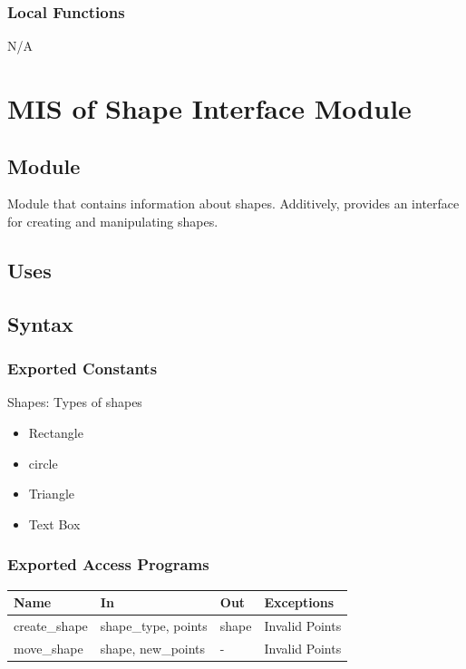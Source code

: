 \documentclass[12pt, titlepage]{article}
\begin{document}
\subsubsection{Local Functions}
N/A

\newpage\section{MIS of {Shape Interface Module}} \label{Shape Interface Module}
%
%

\subsection{Module}
Module that contains information about shapes. Additively, provides an interface for creating and manipulating shapes.

\subsection{Uses}


\subsection{Syntax}

\subsubsection{Exported Constants}
Shapes: Types of shapes
\begin{itemize}
\item{Rectangle}
\item{circle}
\item{Triangle}
\item{Text Box}
\end{itemize}

\subsubsection{Exported Access Programs}

\begin{center}
\begin{tabular}{p{2cm} p{4cm} p{4cm} p{2cm}}
\hline
\textbf{Name} & \textbf{In} & \textbf{Out} & \textbf{Exceptions} \\
\hline
{create\_shape} & shape\_type, points & shape & Invalid Points \\
\hline
{move\_shape} & shape, new\_points & - & Invalid Points \\
\hline
\end{tabular}
\end{center}
\end{document}
